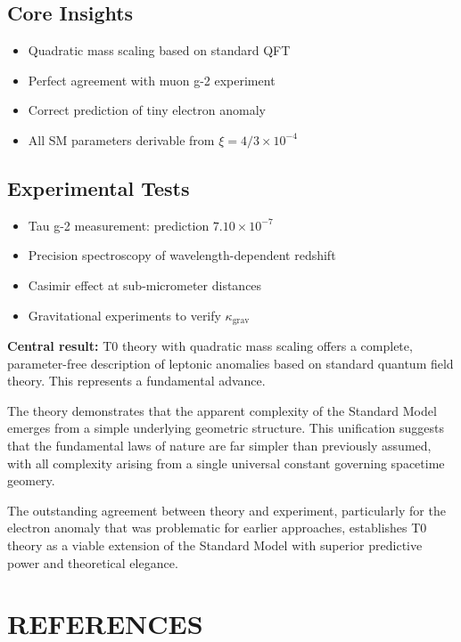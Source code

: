 \documentclass[12pt,a4paper]{article}
\begin{document}
	\subsection{Core Insights}
	\begin{itemize}
		\item Quadratic mass scaling based on standard QFT
		\item Perfect agreement with muon g-2 experiment
		\item Correct prediction of tiny electron anomaly
		\item All SM parameters derivable from $\xi = 4/3 \times 10^{-4}$
	\end{itemize}
	
	\subsection{Experimental Tests}
	\begin{itemize}
		\item Tau g-2 measurement: prediction $7.10 \times 10^{-7}$
		\item Precision spectroscopy of wavelength-dependent redshift
		\item Casimir effect at sub-micrometer distances
		\item Gravitational experiments to verify $\kappa_{\text{grav}}$
	\end{itemize}
	
	\begin{important}
		\textbf{Central result:} T0 theory with quadratic mass scaling offers a complete, parameter-free description of leptonic anomalies based on standard quantum field theory. This represents a fundamental advance.
	\end{important}
	
	The theory demonstrates that the apparent complexity of the Standard Model emerges from a simple underlying geometric structure. This unification suggests that the fundamental laws of nature are far simpler than previously assumed, with all complexity arising from a single universal constant governing spacetime geomery.
	
	The outstanding agreement between theory and experiment, particularly for the electron anomaly that was problematic for earlier approaches, establishes T0 theory as a viable extension of the Standard Model with superior predictive power and theoretical elegance.
	
	\section{REFERENCES}
	
\end{document}
